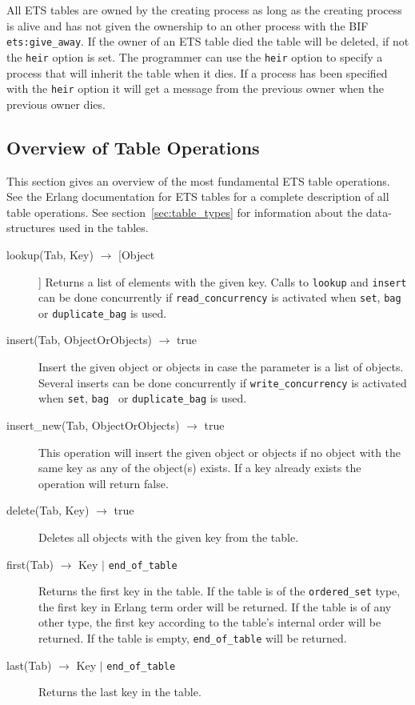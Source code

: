 \documentclass[aps,pre,preprint,nofootinbib]{revtex4}
\begin{document}
All ETS tables are owned by the creating process as long as the creating process is alive and has not given the ownership to an other process with the BIF \verb|ets:give_away|.
If the owner of an ETS table died the table will be deleted, if not the \verb|heir| option is set.
The programmer can use the \verb|heir| option to specify a process that will inherit the table when it dies. 
If a process has been specified with the \verb|heir| option it will get a message from the previous owner when the previous owner dies.

\subsection{Overview of Table Operations}

This section gives an overview of the most fundamental ETS table operations. 
See the Erlang documentation for ETS tables for a complete description of all table operations. 
See section~\ref{sec:table_types} for information about the data-structures used in the tables.

\begin{description}
 \item[lookup(Tab, Key) $\rightarrow$ [Object]] 
 Returns a list of elements with the given key. 
 Calls to \verb|lookup| and \verb|insert| can be done concurrently if \verb|read_concurrency| is activated when \verb|set|, \verb|bag | or \verb|duplicate_bag| is used.
 \item[insert(Tab, ObjectOrObjects) $\rightarrow$ true]
 Insert the given object or objects in case the parameter is a list of objects.
 Several inserts can be done concurrently if \verb|write_concurrency| is activated when \verb|set|, \verb|bag | or \verb|duplicate_bag| is used.
 \item[insert\_new(Tab, ObjectOrObjects) $\rightarrow$ true]
 This operation will insert the given object or objects if no object with the same key as any of the object(s) exists. 
 If a key already exists the operation will return false.
 \item[delete(Tab, Key) $\rightarrow$ true] Deletes all objects with the given key from the table.
 \item[first(Tab) $\rightarrow$ Key $|$ \texttt{end\_of\_table} ] Returns the first key in the table. If the table is of the \verb|ordered_set| type, the first key in Erlang term order will be returned. If the table is of any other type, the first key according to the table's internal order will be returned. If the table is empty, \verb|end_of_table| will be returned.
 \item[last(Tab) $\rightarrow$ Key $|$ \texttt{end\_of\_table} ] Returns the last key in the table.
\end{description}
\end{document}
